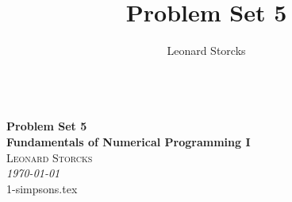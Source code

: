 \documentclass[a4paper, 12pt]{article}
\title{Problem Set 5}
\author{Leonard Storcks}
\theoremstyle{definition}
\begin{document}
\pagestyle{plain}
{\noindent\Huge\bf  \\[0.5\baselineskip] {\selectfont  Problem Set 5}}\\[2\baselineskip]
{ {\bf {}\selectfont Fundamentals of Numerical Programming I}\\
{\textsc{Leonard Storcks}} \\
{\textit{\selectfont     \today}}}
\\[1.4\baselineskip] 


{1-simpsons.tex}


\pagebreak
\thispagestyle{plain}
\printbibliography[title={References}]
\pagebreak

\end{document}
